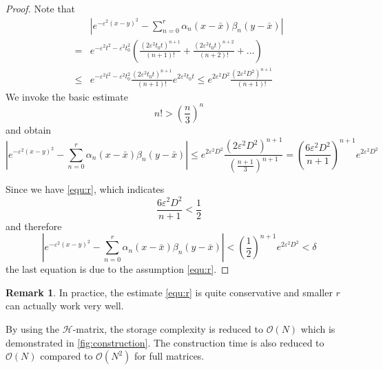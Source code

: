 \documentclass[3p,,preprint,12pt]{elsarticle}
\theoremstyle{definition}
\newtheorem{remark}{Remark}
\begin{document}
\begin{proof}
	Note that 
	\begin{align}
		&|{e^{ - {\varepsilon ^2}{{(x - y)}^2}}} - \sum\limits_{n = 0}^r {{\alpha _n}} (x - \bar x){\beta _n}(y - \bar x)|\\
		 =&  {e^{ - {\varepsilon ^2}{t^2} - {\varepsilon ^2}t_0^2}}\left( {\frac{{{{(2{\varepsilon ^2}{t_0}t)}^{n + 1}}}}{{(n + 1)!}} + \frac{{{{(2{\varepsilon ^2}{t_0}t)}^{n + 2}}}}{{(n + 2)!}} +  \ldots } \right)\\
		\le& {e^{ - {\varepsilon ^2}{t^2} - {\varepsilon ^2}t_0^2}}\frac{{{{(2{\varepsilon ^2}{t_0}t)}^{n + 1}}}}{{(n + 1)!}}{e^{2{\varepsilon ^2}{t_0}t}} \le {e^{2{\varepsilon ^2}{D^2}}}\frac{{{{(2{\varepsilon ^2}{D^2})}^{n + 1}}}}{{(n + 1)!}}
	\end{align}
	We invoke the basic estimate
	\begin{equation}
		n!>\left( \frac{n}{3} \right)^{n}
	\end{equation} 
	and obtain
	\begin{equation}
		|{e^{ - {\varepsilon ^2}{{(x - y)}^2}}} - \sum\limits_{n = 0}^r {{\alpha _n}} (x - \bar x){\beta _n}(y - \bar x)|\leq {e^{2{\varepsilon ^2}{D^2}}}\frac{{{{(2{\varepsilon ^2}{D^2})}^{n + 1}}}}{{{{\left( {\frac{{n + 1}}{3}} \right)}^{n + 1}}}} = {\left( {\frac{{6{\varepsilon ^2}{D^2}}}{{n + 1}}} \right)^{n + 1}}{e^{2{\varepsilon ^2}{D^2}}}
	\end{equation}
	
	Since we have \cref{equ:r}, which indicates 
	\begin{equation}
		{\frac{{6{\varepsilon ^2}{D^2}}}{{n + 1}}}<\frac{1}{2}
	\end{equation}
	and therefore
	\begin{equation}
		|{e^{ - {\varepsilon ^2}{{(x - y)}^2}}} - \sum\limits_{n = 0}^r {{\alpha _n}} (x - \bar x){\beta _n}(y - \bar x)| < {\left( {\frac{1}{2}} \right)^{n + 1}}{e^{2{\varepsilon ^2}{D^2}}} < \delta 
	\end{equation}
	the last equation is due to the assumption \cref{equ:r}.
\end{proof}

\begin{remark}
	In practice, the estimate \cref{equ:r} is quite conservative and smaller $r$ can actually work very well. 
\end{remark}

By using the $\mathcal{H}$-matrix, the storage complexity is reduced to $\mathcal{O}(N)$ which is demonstrated in \cref{fig:construction}. The construction time is also reduced to $\mathcal{O}(N)$ compared to $\mathcal{O}(N^2)$ for full matrices. 
\end{document}
